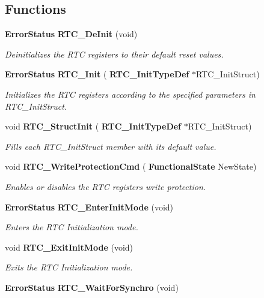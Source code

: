 \subsection*{Functions}
\begin{DoxyCompactItemize}
\item 
\textbf{ Error\+Status} \textbf{ R\+T\+C\+\_\+\+De\+Init} (void)
\begin{DoxyCompactList}\small\item\em Deinitializes the R\+TC registers to their default reset values. \end{DoxyCompactList}\item 
\textbf{ Error\+Status} \textbf{ R\+T\+C\+\_\+\+Init} (\textbf{ R\+T\+C\+\_\+\+Init\+Type\+Def} $\ast$R\+T\+C\+\_\+\+Init\+Struct)
\begin{DoxyCompactList}\small\item\em Initializes the R\+TC registers according to the specified parameters in R\+T\+C\+\_\+\+Init\+Struct. \end{DoxyCompactList}\item 
void \textbf{ R\+T\+C\+\_\+\+Struct\+Init} (\textbf{ R\+T\+C\+\_\+\+Init\+Type\+Def} $\ast$R\+T\+C\+\_\+\+Init\+Struct)
\begin{DoxyCompactList}\small\item\em Fills each R\+T\+C\+\_\+\+Init\+Struct member with its default value. \end{DoxyCompactList}\item 
void \textbf{ R\+T\+C\+\_\+\+Write\+Protection\+Cmd} (\textbf{ Functional\+State} New\+State)
\begin{DoxyCompactList}\small\item\em Enables or disables the R\+TC registers write protection. \end{DoxyCompactList}\item 
\textbf{ Error\+Status} \textbf{ R\+T\+C\+\_\+\+Enter\+Init\+Mode} (void)
\begin{DoxyCompactList}\small\item\em Enters the R\+TC Initialization mode. \end{DoxyCompactList}\item 
void \textbf{ R\+T\+C\+\_\+\+Exit\+Init\+Mode} (void)
\begin{DoxyCompactList}\small\item\em Exits the R\+TC Initialization mode. \end{DoxyCompactList}\item 
\textbf{ Error\+Status} \textbf{ R\+T\+C\+\_\+\+Wait\+For\+Synchro} (void)

\end{DoxyCompactItemize}
